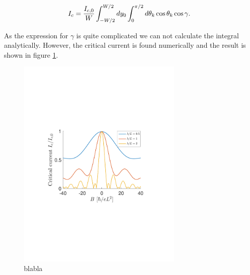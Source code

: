 \begin{equation}
    I_c = \frac{I_{c,0}}{W}\int_{-W/2}^{W/2}dy_0\int_0^{\pi/2}d\theta_k\cos\theta_k\cos\gamma. \\
\end{equation}

As the expression for $\gamma$ is quite complicated we can not calculate the integral analytically. However, the critical current is found numerically and the result is shown in figure \ref{fig:critical_Dist2_phi_0}.
\begin{figure}[hhh]
\centering
\includegraphics[width=8cm,clip=true,trim=3cm 8cm 4cm 9cm]{fig/critical_Dist2_phi_0}
\caption{blabla}
\label{fig:critical_Dist2_phi_0}
\end{figure}


